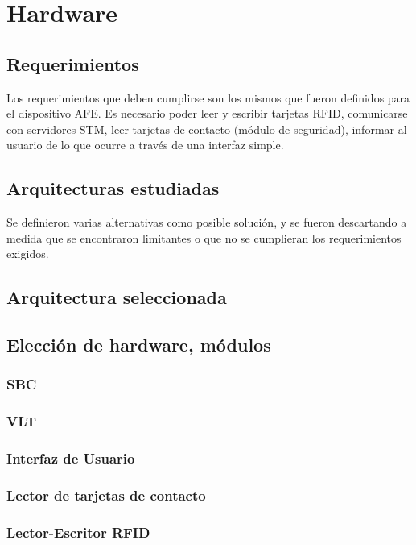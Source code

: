 \chapter{Hardware}

\section{Requerimientos}
Los requerimientos que deben cumplirse son los mismos que fueron definidos para el dispositivo AFE.
Es necesario poder leer y escribir tarjetas RFID, comunicarse con servidores STM, leer tarjetas de contacto (módulo de seguridad), informar al usuario de lo que ocurre a través de una interfaz simple.

\section{Arquitecturas estudiadas}
Se definieron varias alternativas como posible solución, y se fueron descartando a medida que se encontraron limitantes o que no se cumplieran los requerimientos exigidos.



\section{Arquitectura seleccionada}

\section{Elecci\'on de hardware, m\'odulos}
\subsection{SBC}
\subsection{VLT}
\subsection{Interfaz de Usuario}
\subsection{Lector de tarjetas de contacto}
\subsection{Lector-Escritor RFID}

